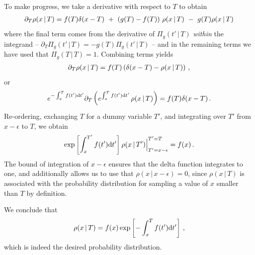 \begin{enumerate}[label=\alph*)]
            To make progress, we take a derivative with respect to \(T\) to obtain
            \begin{align}
                \partial_T \rho(x \, | \, T)
                =
                f(T) \delta(x - T)
                \,\,
                +
                \,\,
                \left(g(T) - f(T)\right)
                \,
                \rho(x \, | \, T)
                \,\,
                -
                \,\,
                g(T) \rho(x\,|\,T)
            \end{align}
            where the final term comes from the derivative of \(\Pi_g(t'\, | \, T)\) \textit{within} the integrand -- \(\partial_T \Pi_g(t'\,|\,T) = -g(T) \Pi_g(t'\,|\,T)\) -- and in the remaining terms we have used that \(\Pi_g(T\,|\,T) = 1\).
            Combining terms yields
            \begin{align}
                \partial_T \rho(x \, | \, T)
                =
                f(T) \left(
                    \delta(x - T)
                    -
                    \rho(x \, | \, T)
                \right)
                \,,
            \end{align}
            or
            \begin{align}
                e^{-\int_x^T f(t') \dd t'}
                \partial_T \left(
                    e^{\int_x^T f(t') \dd t'} \, \rho(x \, | \, T)
                \right)
                =
                f(T) \delta(x - T)
                \,.
            \end{align}
            Re-ordering, exchanging \(T\) for a dummy variable \(T'\), and integrating over \(T'\) from \(x-\epsilon\) to \(T\), we obtain
            \begin{align}
                \exp\left[\int_x^{T'} f(t') \dd t'\right]
                \rho(x \, | \, T')
                \Big|^{T'=T}_{T'=x-\epsilon}
                =
                f(x)
                \,.
            \end{align}
            The bound of integration of \(x - \epsilon\) ensures that the delta function integrates to one, and additionally allows us to use that \(\rho(x \, | \, x - \epsilon) = 0\), since \(\rho(x\,|\,T)\) is associated with the probability distribution for sampling a value of \(x\) smaller than \(T\) by definition.

            We conclude that
            \begin{align}
                \rho(x \, | \, T)
                =
                f(x)
                \exp\left[-\int_x^{T} f(t') \dd t'\right]
                \,,
            \end{align}
            which is indeed the desired probability distribution.
\end{enumerate}


